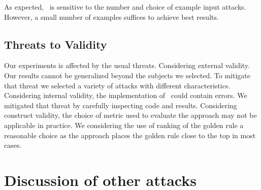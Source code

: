 \documentclass[conference]{IEEEtran}
\begin{document}
\begin{center}
\begin{tcolorbox}[enhanced,width=3.4in,center upper,drop shadow southwest,sharp corners]
As expected, \tname\ is sensitive to the number and choice of example
input attacks. However, a small number of examples suffices to achieve
best results.
\end{tcolorbox}
\end{center}



\subsection{Threats to Validity}
\label{sec:threats}

Our experiments is affected by the usual threats. Considering external
validity. Our results cannot be generalized beyond the subjects we
selected. To mitigate that threat we selected a variety of attacks
with different characteristics. Considering internal validity, the
implementation of \tname\ could contain errors. We mitigated that
threat by carefully inspecting code and results. Considering construct
validity, the choice of metric used to evaluate the approach may not
be applicable in practice. We considering the use of ranking of the
golden rule a reasonable choice as the approach places the golden rule
close to the top in most cases.

\section{Discussion of other attacks}
\label{sec:rce}
\label{sec:jboss}
\label{sec:content-example}
\label{sec:dos}
\end{document}
